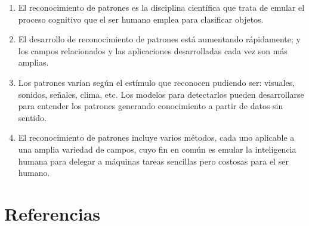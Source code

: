 \documentclass[12pt,spanish,Letterpaper,openany]{book}
\begin{document}
\begin{enumerate}
\def\labelenumi{\arabic{enumi}.}
\item
  El reconocimiento de patrones es la disciplina científica que trata de emular el proceso cognitivo que el ser humano emplea para clasificar objetos.
\item
  El desarrollo de reconocimiento de patrones está aumentando rápidamente; y los campos relacionados y las aplicaciones desarrolladas cada vez son más amplias.
\item
  Los patrones varían según el estímulo que reconocen pudiendo ser: visuales, sonidos, señales, clima, etc. Los modelos para detectarlos pueden desarrollarse para entender los patrones generando conocimiento a partir de datos sin sentido.
\item
  El reconocimiento de patrones incluye varios métodos, cada uno aplicable a una amplia variedad de campos, cuyo fin en común es emular la inteligencia humana para delegar a máquinas tareas sencillas pero costosas para el ser humano.
\end{enumerate}

\hypertarget{referencias-11}{%
\section*{Referencias}\label{referencias-11}}
\end{document}
